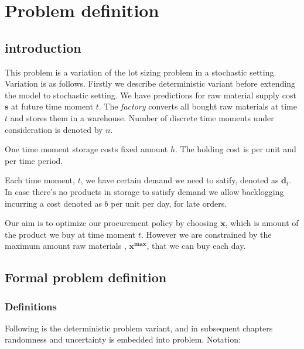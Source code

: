 
\chapter{Problem definition}
\label{chap:prob-def}
\section{introduction}

This problem is a variation of the lot sizing problem in a stochastic setting. Variation is as follows. Firstly we describe deterministic variant before extending the model to stochastic setting. We have predictions for raw material supply cost $\mathbf{s}$ at future time moment $t$. The \emph{factory} converts all bought raw materials at time $t$ and stores them in a warehouse. Number of discrete time moments under consideration is denoted by $n$.

One time moment storage costs fixed amount $h$. The  holding cost is per unit and per time period.

Each time moment, $t$, we have certain demand we need to satify, denoted as $\mathbf{d}_t$. In case there's no products in storage to satisfy demand we allow backlogging incurring a cost denoted as $b$ per unit per day, for late orders.

Our aim is to optimize our procurement policy by choosing $\mathbf{x}$, which is amount of the product we buy at time moment $t$. However we are constrained by the maximum amount raw materials , $\mathbf{x^{\text{max}}}$, that we can buy each day.

\section{Formal problem definition}
\label{sec:prob-def}

\subsection{Definitions}
\label{sub:Definitions}

Following is the deterministic problem variant, and in subsequent chapters randomness and uncertainty is embedded into problem. Notation:

